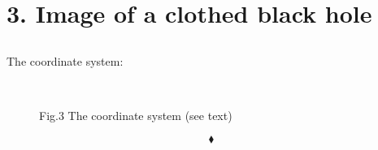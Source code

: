 \chapter{3. Image of a clothed black hole}
\pagebreak[4]

\section{}
\begin{tcolorbox}
The coordinate system:
\end{tcolorbox}


\begin{figure}[H]%
    \centering
\\
\caption{Fig.3 The coordinate system (see text)}
\label{fig:fig3}
\end{figure}
\begin{comment}
\begin{figure}[H]%
    \centering
\\
\label{fig:fig_p8a}
\end{figure}
\end{comment}

$$\blacklozenge$$\newpage